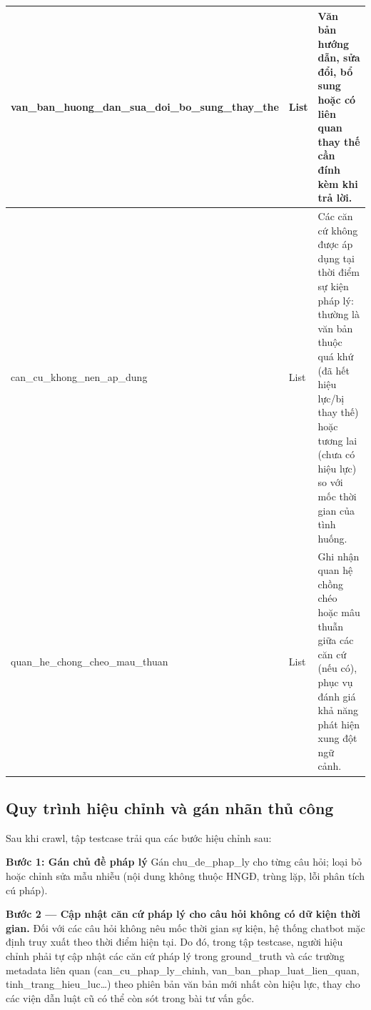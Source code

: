 \documentclass[../DoAn.tex]{subfiles}
\begin{document}
\begin{table}[H]
\begin{tabularx}{\textwidth}{|>{\raggedright\arraybackslash}p{4.4cm}|>{\raggedright\arraybackslash}p{2.0cm}|>{\raggedright\arraybackslash}X|}
\hline
van\_\allowbreak ban\_\allowbreak huong\_\allowbreak dan\_\allowbreak sua\_\allowbreak doi\_\allowbreak bo\_\allowbreak sung\_\allowbreak thay\_\allowbreak the & List & Văn bản hướng dẫn, sửa đổi, bổ sung hoặc có liên quan thay thế cần đính kèm khi trả lời. \\
\hline
can\_\allowbreak cu\_\allowbreak khong\_\allowbreak nen\_\allowbreak ap\_\allowbreak dung & List & Các căn cứ không được áp dụng tại thời điểm sự kiện pháp lý: thường là văn bản thuộc quá khứ (đã hết hiệu lực/bị thay thế) hoặc tương lai (chưa có hiệu lực) so với mốc thời gian của tình huống. \\
\hline
quan\_\allowbreak he\_\allowbreak chong\_\allowbreak cheo\_\allowbreak mau\_\allowbreak thuan & List & Ghi nhận quan hệ chồng chéo hoặc mâu thuẫn giữa các căn cứ (nếu có), phục vụ đánh giá khả năng phát hiện xung đột ngữ cảnh. \\
\hline
\end{tabularx}
\end{table}

\subsection{Quy trình hiệu chỉnh và gán nhãn thủ công}

Sau khi crawl, tập testcase trải qua các bước hiệu chỉnh sau:

\textbf{Bước 1: Gán chủ đề pháp lý}
Gán chu\_de\_phap\_ly cho từng câu hỏi; loại bỏ hoặc chỉnh sửa mẫu nhiễu (nội dung không thuộc HNGĐ, trùng lặp, lỗi phân tích cú pháp).

\textbf{Bước 2 --- Cập nhật căn cứ pháp lý cho câu hỏi không có dữ kiện thời gian.}
Đối với các câu hỏi không nêu mốc thời gian sự kiện, hệ thống chatbot mặc định truy xuất theo thời điểm hiện tại. Do đó, trong tập testcase, người hiệu chỉnh phải tự cập nhật các căn cứ pháp lý trong ground\_\allowbreak truth và các trường metadata liên quan (can\_\allowbreak cu\_\allowbreak phap\_\allowbreak ly\_\allowbreak chinh, van\_\allowbreak ban\_\allowbreak phap\_\allowbreak luat\_\allowbreak lien\_\allowbreak quan, tinh\_\allowbreak trang\_\allowbreak hieu\_\allowbreak luc\ldots) theo phiên bản văn bản mới nhất còn hiệu lực, thay cho các viện dẫn luật cũ có thể còn sót trong bài tư vấn gốc.
\end{document}
